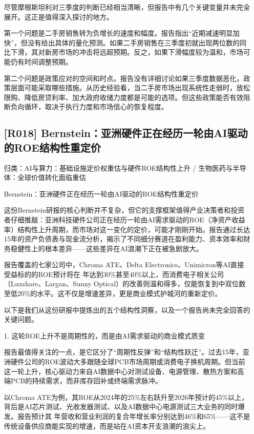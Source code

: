 \documentclass[11pt]{ctexart}
\begin{document}
尽管摩根斯坦利对三季度的判断已经相当清晰，但报告中有几个关键变量并未完全展开。这正是值得深入探讨的地方。

第一个问题是二手房销售转为负增长的速度和幅度。报告指出“近期减速明显加快”，但没有给出具体的量化预测。如果二手房销售在三季度初就出现两位数的同比下滑，其对新房市场的冲击将远超预期。反之，如果下滑幅度较为温和，市场可能仍有时间调整预期。

第二个问题是政策应对的空间和时点。报告没有详细讨论如果三季度数据恶化，政策层面可能采取哪些措施。从历史经验看，当二手房市场出现系统性走弱时，放松限购、降低房贷利率、加大政府收储力度都是可能的选项。但这些政策能否有效阻断负向循环，取决于执行力度和市场信心的恢复程度。

\subsection{[R018] Bernstein：亚洲硬件正在经历一轮由AI驱动的ROE结构性重定价}
{\small\color{refgray}归类：AI与算力：基础设施定价权重估与硬件ROE结构性上升 / 生物医药与半导体：全球价值转化面临重估}

Bernstein：亚洲硬件正在经历一轮由AI驱动的ROE结构性重定价

这份Bernstein研报的核心判断并不复杂，但它的支撑框架值得产业决策者和投资者仔细推敲：亚洲科技硬件公司正在经历一轮由AI需求驱动的ROE（净资产收益率）结构性上升周期，而市场对这一变化的定价，可能才刚刚开始。报告通过长达15年的资产负债表与现金流分析，揭示了不同细分赛道在盈利能力、资本效率和财务稳健性上的根本差异——这些差异在AI浪潮下正在被急剧放大。

报告覆盖的七家公司中，Chroma ATE、Delta Electronics、Unimicron等AI直接受益标的的ROE预计将在 年达到30\%甚至40\%以上，而消费电子相关公司（Luxshare、Largan、Sunny Optical）的改善则温和得多，仅能恢复到中双位数至低20\%的水平。这不仅是增速差异，更是商业模式护城河的重新定价。

以下是我们从这份研报中提炼出的五个结构性洞察，以及一个报告尚未完全回答的关键问题。

1. 这轮ROE上升不是周期性的，而是由AI需求驱动的商业模式质变

报告最值得关注的一点，是它区分了“周期性反弹”和“结构性跃迁”。过去15年，亚洲硬件公司的ROE波动大多跟随全球PCB市场周期或消费电子换机周期。但当前这一轮上升，核心驱动力来自AI数据中心对测试设备、电源管理、散热方案和高端PCB的持续需求，而非库存回补或终端需求脉冲。

以Chroma ATE为例，其ROE从2024年的25\%左右跃升至2026年预计的45\%以上，背后是AI芯片测试、光收发器测试、以及AI数据中心电源测试三大业务的同时爆发。报告预计其 年营收和营业利润的复合年增长率分别达到46\%和65\%——这不是传统设备供应商能实现的增速，而是站在AI资本开支浪潮的浪尖上。
\end{document}
